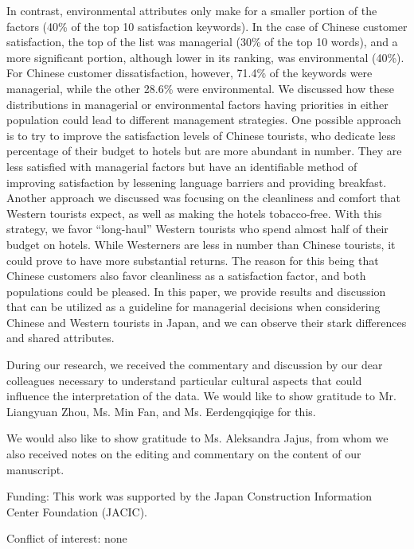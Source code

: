 \documentclass[smallextended,natbib]{svjour3}       %
\begin{document}
    In contrast, environmental attributes only make for a smaller portion of the factors (40\% of the top 10 satisfaction keywords). In the case of Chinese customer satisfaction, the top of the list was managerial (30\% of the top 10 words), and a more significant portion, although lower in its ranking, was environmental (40\%). For Chinese customer dissatisfaction, however, 71.4\% of the keywords were managerial, while the other 28.6\% were environmental. We discussed how these distributions in managerial or environmental factors having priorities in either population could lead to different management strategies. One possible approach is to try to improve the satisfaction levels of Chinese tourists, who dedicate less percentage of their budget to hotels but are more abundant in number. They are less satisfied with managerial factors but have an identifiable method of improving satisfaction by lessening language barriers and providing breakfast. Another approach we discussed was focusing on the cleanliness and comfort that Western tourists expect, as well as making the hotels tobacco-free. With this strategy, we favor ``long-haul'' Western tourists who spend almost half of their budget on hotels. While Westerners are less in number than Chinese tourists, it could prove to have more substantial returns. The reason for this being that Chinese customers also favor cleanliness as a satisfaction factor, and both populations could be pleased. In this paper, we provide results and discussion that can be utilized as a guideline for managerial decisions when considering Chinese and Western tourists in Japan, and we can observe their stark differences and shared attributes. 

\begin{acknowledgements}

  During our research, we received the commentary and discussion by our dear colleagues necessary to understand particular cultural aspects that could influence the interpretation of the data. We would like to show gratitude to Mr. Liangyuan Zhou, Ms. Min Fan, and Ms. Eerdengqiqige for this.

  We would also like to show gratitude to Ms. Aleksandra Jajus, from whom we also received notes on the editing and commentary on the content of our manuscript.

  \medskip

  Funding: This work was supported by the Japan Construction Information Center Foundation (JACIC).

  \medskip

  Conflict of interest: none

\end{acknowledgements}



\end{document}

